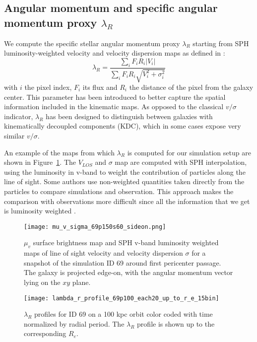 \subsection{Angular momentum and specific angular momentum proxy $\lambda_R$}
We compute the specific stellar angular momentum proxy $\lambda_R$ starting from SPH luminosity-weighted velocity and velocity dispersion maps as defined in \citet{Emsellem2007}: %
\begin{equation}
 \lambda_R = \dfrac{\sum_i F_i R_i |V_i|}{\sum_i F_i R_i \sqrt{V_i^2 + \sigma_i^2}}
\end{equation}
with $i$ the pixel index, $F_i$ its flux and $R_i$ the distance of the pixel from the galaxy center.
This parameter has been introduced to better capture the spatial information included in the kinematic maps.
As opposed to the classical $v/\sigma$ indicator, $\lambda_R$ has been designed to distinguish between galaxies with kinematically decoupled components (KDC), which in some cases expose very similar $v/\sigma$.

An example of the maps from which $\lambda_R$ is computed for our simulation setup are shown in Figure~\ref{fig:maps_lambda_r}.
The $V_{LOS}$ and $\sigma$ map are computed with SPH interpolation, using the luminosity in $\mathrm{v}$-band to weight the contribution of particles along the line of sight.
Some authors \citep[e.g.][]{Schulze2018,Pillepich2019} use non-weighted quantities taken directly from the particles to compare simulations and observation. %
This approach makes the comparison with observations more difficult since all the information that we get is luminosity weighted \citep{Walo-Martin2020}.

\begin{figure}[t]
\centering
\texttt{[image: mu\_v\_sigma\_69p150s60\_sideon.png]}
\caption{$\mu_v$ surface brightness map and SPH v-band luminosity weighted maps of line of sight velocity and velocity dispersion $\sigma$ for a snapshot of the simulation ID 69 around first pericenter passage.
The galaxy is projected edge-on, with the angular momentum vector lying on the $xy$ plane.}
\label{fig:maps_lambda_r}
\end{figure}

\begin{figure}[b]
\centering
\texttt{[image: lambda\_r\_profile\_69p100\_each20\_up\_to\_r\_e\_15bin]}
\caption{$\lambda_R$ profiles for ID 69 on a 100 kpc orbit color coded with time normalized by radial period.
The $\lambda_R$ profile is shown up to the corresponding $R_e$.}
\label{fig:lambda_r_profile}
\end{figure}

